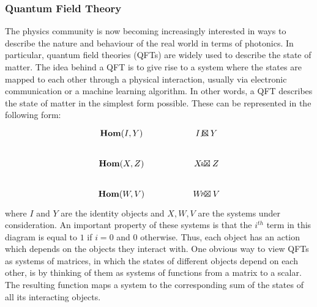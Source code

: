 \documentclass[a4paper,reqno,oneside]{article}
\begin{document}
\subsubsection{Quantum Field Theory}
The physics community is now becoming increasingly interested in ways to describe the nature and behaviour of the real world in terms of photonics. In particular, quantum field theories (QFTs) are widely used to describe the state of matter. The idea behind a QFT is to give rise to a system where the states are mapped to each other through a physical interaction, usually via electronic communication or a machine learning algorithm. In other words, a QFT describes the state of matter in the simplest form possible. These can be represented in the following form: 
\begin{equation}\label{eq:example:qft}
\begin{tikzcd}[ampersand replacement=\&]
\mathbf{Hom}(I,Y) \&\& I \boxtimes Y \arrow["f", shift left=1em, shift right=1em] \\
\mathbf{Hom}(X,Z) \&\& X \boxtimes Z \arrow["k", shift left=1em, shift right=1em] \\
\mathbf{Hom}(W,V) \&\& W \boxtimes V \arrow["p", shift left=1em, shift right=1em]
\end{tikzcd}
\end{equation}
where $I$ and $Y$ are the identity objects and $X,W,V$ are the systems under consideration. An important property of these systems is that the $i^{th}$ term in this diagram is equal to $1$ if $i=0$ and $0$ otherwise. Thus, each object has an action which depends on the objects they interact with. One obvious way to view QFTs as systems of matrices, in which the states of different objects depend on each other, is by thinking of them as systems of functions from a matrix to a scalar. The resulting function maps a system to the corresponding sum of the states of all its interacting objects.
\end{document}
